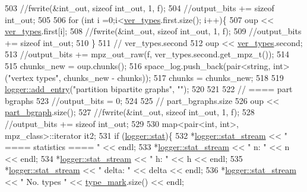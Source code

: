 \begin{DoxyCode}
503   \textcolor{comment}{//fwrite(&int\_out, sizeof int\_out, 1, f);}
504   \textcolor{comment}{//output\_bits += sizeof int\_out;}
505 
506   \textcolor{keywordflow}{for} (\textcolor{keywordtype}{int} i =0;i<\hyperlink{classmarked__graph__compressed_af446cc5e23c241a92b76642fd5ebc403}{ver\_types}.first.size(); i++)\{
507     oup <<  \hyperlink{classmarked__graph__compressed_af446cc5e23c241a92b76642fd5ebc403}{ver\_types}.first[i];
508     \textcolor{comment}{//fwrite(&int\_out, sizeof int\_out, 1, f);}
509     \textcolor{comment}{//output\_bits += sizeof int\_out;}
510   \}
511   \textcolor{comment}{// ver\_types.second}
512   oup << \hyperlink{classmarked__graph__compressed_af446cc5e23c241a92b76642fd5ebc403}{ver\_types}.second;
513   \textcolor{comment}{//output\_bits += mpz\_out\_raw(f, ver\_types.second.get\_mpz\_t());}
514 
515   chunks\_new = oup.chunks();
516   space\_log.push\_back(pair<string, int> (\textcolor{stringliteral}{"vertex types"}, chunks\_new - chunks));
517   chunks = chunks\_new;
518 
519   \hyperlink{classlogger_a710163deb17bc81f70d53d285b8ac9ac}{logger::add\_entry}(\textcolor{stringliteral}{"partition bipartite graphs"}, \textcolor{stringliteral}{""});
520   
521 
522   \textcolor{comment}{// ==== part bgraphs}
523   \textcolor{comment}{//output\_bits = 0;}
524 
525   \textcolor{comment}{// part\_bgraphs.size}
526   oup << \hyperlink{classmarked__graph__compressed_a7b3267063fba30b45eb21b3ba4e07536}{part\_bgraph}.size();
527   \textcolor{comment}{//fwrite(&int\_out, sizeof int\_out, 1, f);}
528   \textcolor{comment}{//output\_bits += sizeof int\_out;}
529 
530   map<pair<int, int>, mpz\_class>::iterator it2;
531   \textcolor{keywordflow}{if} (\hyperlink{classlogger_a26812b5ba03f130e8dae3446d5fc032f}{logger::stat})\{
532     *\hyperlink{classlogger_a7db37821f875f2ba3540980b355779f5}{logger::stat\_stream} << \textcolor{stringliteral}{" ==== statistics ==== "} << endl;
533     *\hyperlink{classlogger_a7db37821f875f2ba3540980b355779f5}{logger::stat\_stream} << \textcolor{stringliteral}{" n:                "} << n << endl;
534     *\hyperlink{classlogger_a7db37821f875f2ba3540980b355779f5}{logger::stat\_stream} << \textcolor{stringliteral}{" h:                "} << h << endl;
535     *\hyperlink{classlogger_a7db37821f875f2ba3540980b355779f5}{logger::stat\_stream} << \textcolor{stringliteral}{" delta:            "} << delta << endl;
536     *\hyperlink{classlogger_a7db37821f875f2ba3540980b355779f5}{logger::stat\_stream} << \textcolor{stringliteral}{" No. types         "} << 
      \hyperlink{classmarked__graph__compressed_a86b00223525703e973415cbc9c94da68}{type\_mark}.size() << endl;

\end{DoxyCode}
